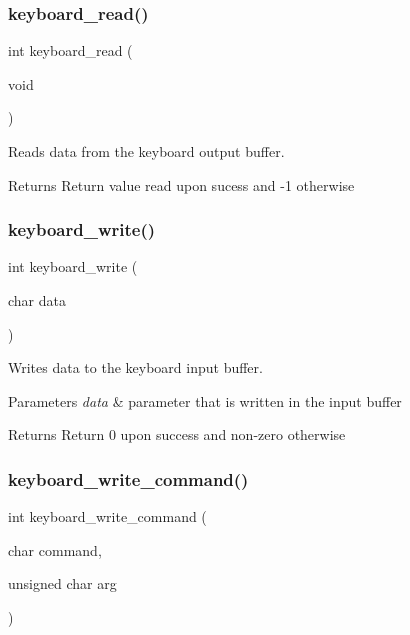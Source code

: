 \subsubsection{\texorpdfstring{keyboard\+\_\+read()}{keyboard\_read()}}
{\footnotesize\ttfamily int keyboard\+\_\+read (\begin{DoxyParamCaption}\item[{void}]{ }\end{DoxyParamCaption})}



Reads data from the keyboard output buffer. 

\begin{DoxyReturn}{Returns}
Return value read upon sucess and -\/1 otherwise 
\end{DoxyReturn}
\hypertarget{group__keyboard_ga26c2eb6181cabae35aff87fc387de0e9}{}\label{group__keyboard_ga26c2eb6181cabae35aff87fc387de0e9} 
\subsubsection{\texorpdfstring{keyboard\+\_\+write()}{keyboard\_write()}}
{\footnotesize\ttfamily int keyboard\+\_\+write (\begin{DoxyParamCaption}\item[{char}]{data }\end{DoxyParamCaption})}



Writes data to the keyboard input buffer. 


\begin{DoxyParams}{Parameters}
{\em data} & parameter that is written in the input buffer\\
\hline
\end{DoxyParams}
\begin{DoxyReturn}{Returns}
Return 0 upon success and non-\/zero otherwise 
\end{DoxyReturn}
\hypertarget{group__keyboard_ga279ddeca4cafee5084a0eec40e28d223}{}\label{group__keyboard_ga279ddeca4cafee5084a0eec40e28d223} 
\subsubsection{\texorpdfstring{keyboard\+\_\+write\+\_\+command()}{keyboard\_write\_command()}}
{\footnotesize\ttfamily int keyboard\+\_\+write\+\_\+command (\begin{DoxyParamCaption}\item[{char}]{command,  }\item[{unsigned char}]{arg }\end{DoxyParamCaption})}




